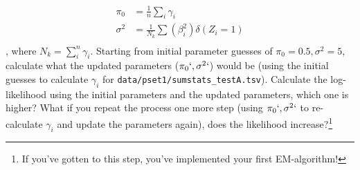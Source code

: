 \documentclass{pset}
\begin{document}
\begin{enumerate}
$$
\begin{aligned}
\pi_0 &= \frac{1}{n}\sum_{i} \gamma_i\\
\sigma^2 &= \frac{1}{N_k} \sum (\beta_i^2)\delta(Z_i = 1)\\
\end{aligned}
$$
, where $N_k = \sum_i^n \gamma_i$. Starting from initial parameter guesses of $\pi_0 = 0.5, \sigma^2 = 5$, calculate what the updated parameters ($\pi_0`, \sigma^2`$) would be (using the initial guesses to calculate $\gamma_i$ for \texttt{data/pset1/sumstats\_testA.tsv}). Calculate the log-likelihood using the initial parameters and the updated parameters, which one is higher? What if you repeat the process one more step (using $\pi_0`, \sigma^2`$ to re-calculate $\gamma_i$ and update the parameters again), does the likelihood increase?\footnote{If you've gotten to this step, you've implemented your first EM-algorithm!}  

\end{enumerate}
\end{document}
